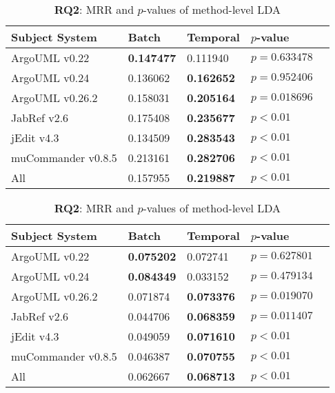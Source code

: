 \begin{table}[t]
\renewcommand{\arraystretch}{1.3}
\footnotesize
\centering
\caption{{\bf RQ2}: MRR and $p$-values of class-level LDA}
\begin{tabular}{l|ll|ll}
\toprule
Subject System & Batch & Temporal & $p$-value  \\
\midrule
ArgoUML v0.22 & {\bf 0.147477 } & 0.111940 & $p = 0.633478$ \\
ArgoUML v0.24 & 0.136062 & {\bf 0.162652 } & $p = 0.952406$ \\
ArgoUML v0.26.2 & 0.158031 & {\bf 0.205164 } & $p = 0.018696$ \\
JabRef v2.6 & 0.175408 & {\bf 0.235677 } & $p < 0.01$ \\
jEdit v4.3 & 0.134509 & {\bf 0.283543 } & $p < 0.01$ \\
muCommander v0.8.5 & 0.213161 & {\bf 0.282706 } & $p < 0.01$ \\
\midrule
All & 0.157955 & {\bf 0.219887 } & $p < 0.01$ \\
\bottomrule
\end{tabular}
\label{table:rq2:class:lda}
\caption{{\bf RQ2}: MRR and $p$-values of method-level LDA}
\begin{tabular}{l|ll|ll}
\toprule
Subject System & Batch & Temporal & $p$-value  \\
\midrule
ArgoUML v0.22 & {\bf 0.075202 } & 0.072741 & $p = 0.627801$ \\
ArgoUML v0.24 & {\bf 0.084349 } & 0.033152 & $p = 0.479134$ \\
ArgoUML v0.26.2 & 0.071874 & {\bf 0.073376 } & $p = 0.019070$ \\
JabRef v2.6 & 0.044706 & {\bf 0.068359 } & $p = 0.011407$ \\
jEdit v4.3 & 0.049059 & {\bf 0.071610 } & $p < 0.01$ \\
muCommander v0.8.5 & 0.046387 & {\bf 0.070755 } & $p < 0.01$ \\
\midrule
All & 0.062667 & {\bf 0.068713 } & $p < 0.01$ \\
\bottomrule
\end{tabular}
\label{table:rq2:method:lda}
\end{table}
